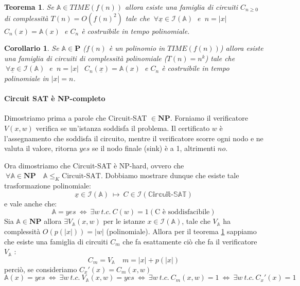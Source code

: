 \documentclass[a4paper]{article}
\newtheorem{thm}{Teorema}[subsection]
\newtheorem{coroll}{Corollario}[subsection]
\theoremstyle{definition}
\newcommand{\p}{\mathbf{P}}
\newcommand{\np}{\mathbf{NP}}
\newcommand{\prob}[1]{\mathbb{#1}}
\newcommand{\instance}[1]{\mathcal{I}(\prob{#1})}
\begin{document}
		\begin{thm}
			\label{thm:circfam}
			Se $ \prob{A} \in TIME(f(n)) $ allora esiste una famiglia di circuiti $ C_{n\geq 0} $ di complessità $ T(n) = O(f(n)^2) $ tale che $ \ \forall \underline{x} \in \instance{A}\ $ e $ \ n = \vert x \vert\ $ $ C_n(x) = \prob{A}(x)\ $ e $ C_n $ è costruibile in tempo polinomiale.
		\end{thm}
		
		\begin{coroll}
			Se $ \prob{A} \in \p $ ($ f(n) $ è un polinomio in $ TIME(f(n)) $) allora esiste una famiglia di circuiti di complessità polinomiale ($ T(n) = n^k $) tale che $ \ \forall\underline{x} \in \instance{A} \ $ e $ \ n = \vert x \vert \ \ $ $ C_n(\underline{x}) = \prob{A}(x) \ $ e $ C_n $ è costruibile in tempo polinomiale in $ \vert x \vert = n $. 
		\end{coroll}
		
		\paragraph{Circuit SAT è NP-completo} Dimostriamo prima a parole che Circuit-SAT $ \in \np $. Forniamo il verificatore $ V(x,w) $ verifica se un'istanza soddisfa il problema. Il certificato $ w $ è l'assegnamento che soddisfa il circuito, mentre il verificatore scorre ogni nodo e ne valuta il valore, ritorna $ yes $ se il nodo finale (sink) è a 1, altrimenti $ no $.
		
		Ora dimostriamo che Circuit-SAT è NP-hard, ovvero che $ \ \forall \prob{A} \in \np \quad \prob{A} \leq_K \text{Circuit-SAT} $. Dobbiamo mostrare dunque che esiste tale trasformazione polinomiale:
		\[
			\underline{x} \in \instance{A} \ \longmapsto \ C\in \instance{\text{Circuit-SAT}}
		\]
		e vale anche che:
		\[
			\prob{A} = yes \ \Leftrightarrow \ \exists w \ t.c. \ C(w) = 1 (\text{C è soddisfacibile})
		\]
		Sia $ \prob{A} \in \np $ allora $ \exists V_{\prob{A}}(x, w) $ per le istanze $ x \in \instance{A} $, tale che $ V_{\prob{A}} $ ha complessità $ O(p(\vert x\vert)) = \vert w \vert $ (polinomiale). Allora per il teorema \ref{thm:circfam} sappiamo che esiste una famiglia di circuiti $ C_m $ che fa esattamente ciò che fa il verificatore $ V_{\prob{A}} $ :
		\[
			C_m = V_{\prob{A}} \quad m = \vert x \vert + p(\vert x\vert)
		\]
		perciò, se consideriamo $ C_x'(x) = C_m(x, w) $
		\[
			\prob{A}(x) = yes \ \Leftrightarrow \ \exists w\ t.c. \ V_{\prob{A}}(x, w) = yes \ \Leftrightarrow \ \exists w\ t.c. \ C_m(x, w) = 1 \ \Leftrightarrow \ \exists w\ t.c. \ C_x'(x) = 1 
		\]
		
\end{document}
